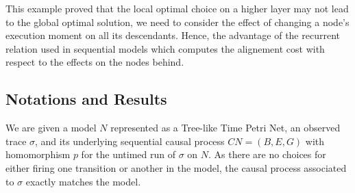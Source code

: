 \documentclass[conference]{IEEEtran}
\begin{document}
This example proved that the local optimal choice on a higher layer may not lead to the global optimal solution, we need to consider the effect of changing a node's execution moment on all its descendants.
Hence, the advantage of the recurrent relation used in sequential models which computes the alignement cost with respect to the effects on the nodes behind. 

\subsection*{Notations and Results}
We are given a model $N$ represented as a Tree-like Time Petri Net, an observed trace $\sigma$, and its underlying sequential causal process $CN = (B, E, G)$ with homomorphism $p$ for the untimed run of $\sigma$ on $N$. 
As there are no choices for either firing one transition or another in the model, the causal process associated to $\sigma$ exactly matches the model.
\end{document}
